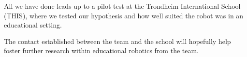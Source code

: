 
\bigskip\noindent
All we have done leads up to a pilot test at the Trondheim International School (THIS), where we tested our hypothesis and how well suited the \chirp robot was in an educational setting. 

\bigskip\noindent
The contact established between the \chirp team and the school will hopefully help foster further research within educational robotics from the \chirp team.





